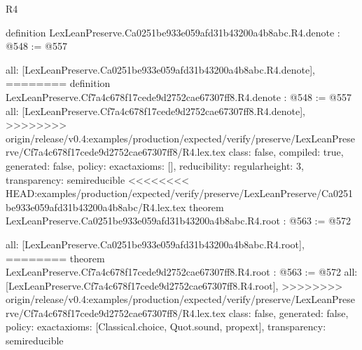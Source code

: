 \begin{lexlean}{R4}
\begin{coremodule}
{{{{{{definition LexLeanPreserve.Ca0251be933e059afd31b43200a4b8abc.R4.denote : @548 := @557 {
  all: [LexLeanPreserve.Ca0251be933e059afd31b43200a4b8abc.R4.denote],
========
definition LexLeanPreserve.Cf7a4c678f17cede9d2752cae67307ff8.R4.denote : @548 := @557 {
  all: [LexLeanPreserve.Cf7a4c678f17cede9d2752cae67307ff8.R4.denote],
>>>>>>>> origin/release/v0.4:examples/production/expected/verify/preserve/LexLeanPreserve/Cf7a4c678f17cede9d2752cae67307ff8/R4.lex.tex
  class: false,
  compiled: true,
  generated: false,
  policy: exact{axioms: []},
  reducibility: regular{height: 3},
  transparency: semireducible
}
<<<<<<<< HEAD:examples/production/expected/verify/preserve/LexLeanPreserve/Ca0251be933e059afd31b43200a4b8abc/R4.lex.tex
theorem LexLeanPreserve.Ca0251be933e059afd31b43200a4b8abc.R4.root : @563 := @572 {
  all: [LexLeanPreserve.Ca0251be933e059afd31b43200a4b8abc.R4.root],
========
theorem LexLeanPreserve.Cf7a4c678f17cede9d2752cae67307ff8.R4.root : @563 := @572 {
  all: [LexLeanPreserve.Cf7a4c678f17cede9d2752cae67307ff8.R4.root],
>>>>>>>> origin/release/v0.4:examples/production/expected/verify/preserve/LexLeanPreserve/Cf7a4c678f17cede9d2752cae67307ff8/R4.lex.tex
  class: false,
  generated: false,
  policy: exact{axioms: [Classical.choice, Quot.sound, propext]},
  transparency: semireducible
}

}}}}}}}}
\end{coremodule}
\end{lexlean}
